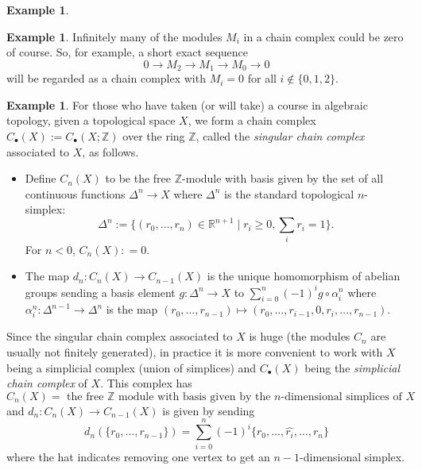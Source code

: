 \documentclass{amsart}[12pt]
\def\a{\alpha}
\newcommand{\R}{{\mathbb{R}}}
\newcommand{\Z}{\mathbb{Z}}
\newcommand{\DEF}[1]{\emph{#1}\index{#1}}
\numberwithin{equation}{section}
\theoremstyle{plain} %
\theoremstyle{definition}
\newtheorem{ex}[equation]{Example}
\theoremstyle{remark}
\begin{document}
\begin{ex}
\begin{ex}
Infinitely many of the modules $M_i$ in a chain complex could be zero of course.  So, for example,
    a short exact sequence
    $$
    0 \to M_2 \to M_1 \to M_0 \to 0
    $$
    will be regarded as a chain complex with $M_i = 0$ for all $i \notin \{0,1,2\}$. %
\end{ex}

    \begin{ex}
    \label{ex:simplicialhomology}
     For those who have taken (or will take) a course in algebraic topology, given a topological space $X$, we form a chain complex $C_\bullet(X):=C_\bullet(X; \Z)$
      over the ring
      $\Z$, called the \DEF{singular chain complex} associated to $X$, as follows.
     
     \begin{itemize}
     \item  Define $C_n(X)$ to be the free $\Z$-module with basis given by the set of all continuous functions $\Delta^n \to X$ where $\Delta^n$ is the standard topological
      $n$-simplex: \[\Delta^n := \{(r_0, \dots, r_n) \in \R^{n+1} \mid r_i \geq 0, \sum_i r_i = 1\}.\]
      For $n < 0$, $C_n(X) : = 0$. 
      \item The map $d_n: C_{n}(X) \to C_{n-1}(X)$ is the unique homomorphism of abelian groups sending a basis element $g: \Delta^n \to X$ to $\sum_{i=0}^n (-1)^i g \circ \a^n_i$ where $\a^n_i: \Delta^{n-1} \to  \Delta^n$ is the map $(r_0, \dots, r_{n-1}) \mapsto (r_0, \dots, r_{i-1}, 0 , r_i, \dots, r_{n-1})$.
      \end{itemize}
      
  Since the singular chain complex associated to $X$ is huge (the modules $C_n$ are usually not finitely generated), in practice it is more convenient to work with $X$ being a simplicial complex (union of simplices) and $C_\bullet(X)$ being the  {\em simplicial chain complex} of $X$. This complex has \[C_n(X)=\textrm{ the free $\Z$ module with basis given by the $n$-dimensional simplices of $X$}\]
   and $d_n: C_{n}(X) \to C_{n-1}(X)$ is given by sending \[d_n (\{r_0, \dots, r_{n-1}\}) =\sum_{i=0}^n (-1)^i \{r_0,\ldots, \hat{r_i}, \ldots, r_n\}\] where the hat indicates removing one vertex to get an $n-1$-dimensional simplex.
      

\end{ex}
\end{ex}
\end{document}
